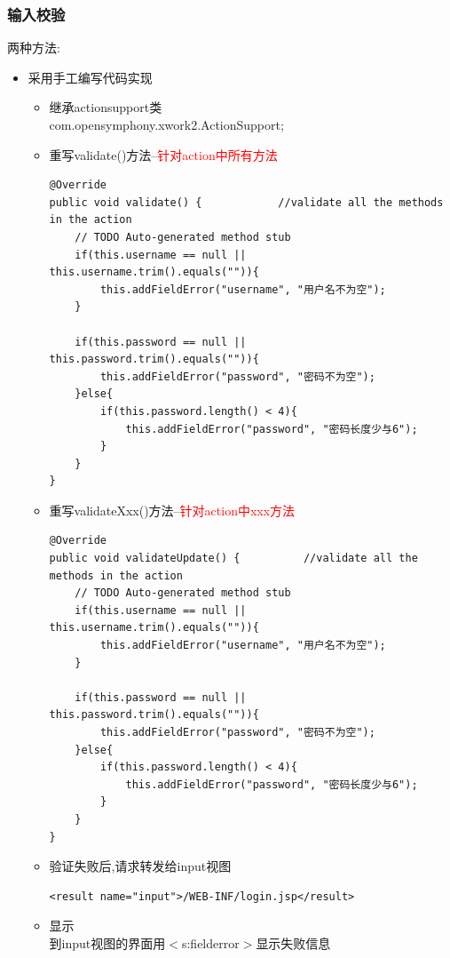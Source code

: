 \subsubsection{输入校验}
两种方法:
\begin{itemize}
\item 采用手工编写代码实现
\begin{itemize}
\item 继承actionsupport类\\
com.opensymphony.xwork2.ActionSupport;
\item 重写validate()方法--\textcolor{red}{针对action中所有方法}
\begin{lstlisting}[style=JAVA]
@Override
public void validate() {			//validate all the methods in the action
	// TODO Auto-generated method stub
	if(this.username == null || this.username.trim().equals("")){
		this.addFieldError("username", "用户名不为空");
	}
		
	if(this.password == null || this.password.trim().equals("")){
		this.addFieldError("password", "密码不为空");
	}else{
		if(this.password.length() < 4){
			this.addFieldError("password", "密码长度少与6");
		}
	}
}
\end{lstlisting}
\item 重写validateXxx()方法--\textcolor{red}{针对action中xxx方法}
\begin{lstlisting}[style=JAVA]
@Override
public void validateUpdate() {			//validate all the methods in the action
	// TODO Auto-generated method stub
	if(this.username == null || this.username.trim().equals("")){
		this.addFieldError("username", "用户名不为空");
	}
		
	if(this.password == null || this.password.trim().equals("")){
		this.addFieldError("password", "密码不为空");
	}else{
		if(this.password.length() < 4){
			this.addFieldError("password", "密码长度少与6");
		}
	}
}
\end{lstlisting}
\item 验证失败后,请求转发给input视图
\begin{lstlisting}[style=JAVA]
<result name="input">/WEB-INF/login.jsp</result>
\end{lstlisting}
\item 显示\\
到input视图的界面用$<$s:fielderror$>$显示失败信息


\end{itemize}
\end{itemize}
